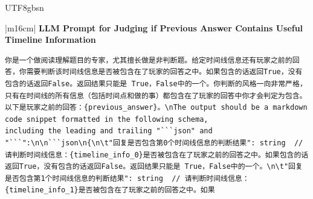 \documentclass[11pt]{article}
\begin{document}
{\begin{CJK}{UTF8}{gbsn}
\begin{table}[ht!]
\begin{minipage}{\textwidth}
\begin{tabular}{|m{16cm}|}
  \textbf{LLM Prompt for Judging if Previous Answer Contains Useful Timeline Information}  \\
\hline
\begin{minipage}[t]{\linewidth}
\small\begin{verbatim}
你是一个做阅读理解题目的专家，尤其擅长做是非判断题。给定时间线信息还有玩家之前的回答，你需要判断该时间线信息是否被包含在了玩家的回答之中。如果包含的话返回True，没有包含的话返回False。返回结果只能是 True，False中的一个。你判断的风格一向非常严格，只有在时间线的所有信息（包括时间点和做的事）都包含在了玩家的回答中你才会判定为包含。以下是玩家之前的回答：{previous_answer}。\nThe output should be a markdown code snippet formatted in the following schema, 
including the leading and trailing "```json" and "```":\n\n```json\n{\n\t"回复是否包含第0个时间线信息的判断结果": string  // 请判断时间线信息：{timeline_info_0}是否被包含在了玩家之前的回答之中。如果包含的话返回True，没有包含的话返回False。返回结果只能是 True，False中的一个。\n\t"回复是否包含第1个时间线信息的判断结果": string  // 请判断时间线信息：{timeline_info_1}是否被包含在了玩家之前的回答之中。如果

\end{verbatim}
\end{minipage} \\
\end{tabular}
\end{minipage}


\end{table}
\end{CJK}


}
\end{document}

